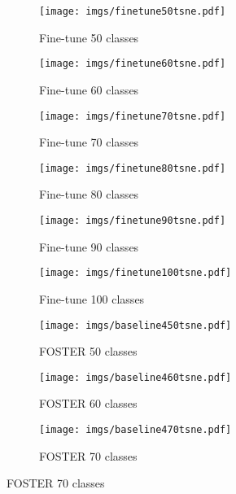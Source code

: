 \documentclass[runningheads]{llncs}
\begin{document}
\begin{figure}[t]
    \centering
    \begin{subfigure}[b]{0.31\linewidth}
    \texttt{[image: imgs/finetune50tsne.pdf]}
    \caption{Fine-tune 50 classes}
    \label{fig:finetunef50}
  \end{subfigure}
  \hfill
\begin{subfigure}[b]{0.31\linewidth}
    \texttt{[image: imgs/finetune60tsne.pdf]}
    \caption{Fine-tune 60 classes }
    \label{fig:finetunef60}
  \end{subfigure}
  \hfill
 \begin{subfigure}[b]{0.31\linewidth}
    \texttt{[image: imgs/finetune70tsne.pdf]}
    \caption{Fine-tune 70 classes }
    \label{fig:finetunef70}
  \end{subfigure}
  \hfill
\begin{subfigure}[b]{0.31\linewidth}
    \texttt{[image: imgs/finetune80tsne.pdf]}
    \caption{Fine-tune 80 classes }
    \label{fig:finetunef80}
  \end{subfigure}
  \hfill
\begin{subfigure}[b]{0.31\linewidth}
    \texttt{[image: imgs/finetune90tsne.pdf]}
    \caption{Fine-tune 90 classes }
    \label{fig:finetunef90}
  \end{subfigure}
  \hfill
\begin{subfigure}[b]{0.31\linewidth}
    \texttt{[image: imgs/finetune100tsne.pdf]}
    \caption{Fine-tune 100 classes }
    \label{fig:finetunef100}
  \end{subfigure}
  \hfill
    \begin{subfigure}[b]{0.31\linewidth}
    \texttt{[image: imgs/baseline450tsne.pdf]}
    \caption{FOSTER 50 classes}
    \label{fig:f50}
  \end{subfigure}
  \hfill
   \begin{subfigure}[b]{0.31\linewidth}
    \texttt{[image: imgs/baseline460tsne.pdf]}
    \caption{FOSTER 60 classes }
    \label{fig:f60}
  \end{subfigure}
  \hfill
   \begin{subfigure}[b]{0.31\linewidth}
    \texttt{[image: imgs/baseline470tsne.pdf]}
    \caption{FOSTER 70 classes }
    \label{fig:f70}
  \end{subfigure}


\end{figure}
\end{document}
